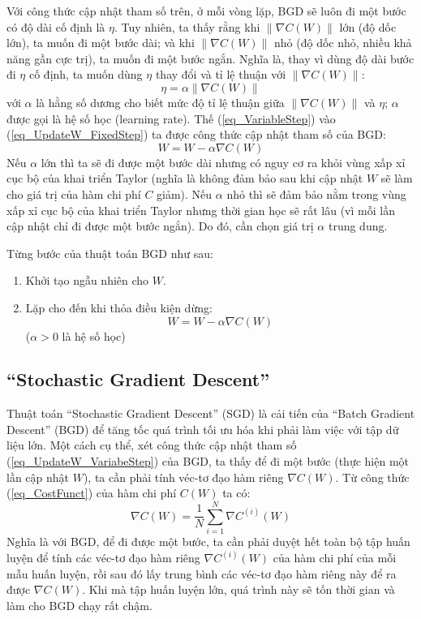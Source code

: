 Với công thức cập nhật tham số trên, ở mỗi vòng lặp, BGD sẽ luôn đi một bước có độ dài cố định là $\eta$. Tuy nhiên, ta thấy rằng khi $\|\nabla C(W)\|$ lớn (độ dốc lớn), ta muốn đi một bước dài; và khi $\|\nabla C(W)\|$ nhỏ (độ dốc nhỏ, nhiều khả năng gần cực trị), ta muốn đi một bước ngắn. Nghĩa là, thay vì dùng độ dài bước đi $\eta$ cố định, ta muốn dùng $\eta$ thay đổi và tỉ lệ thuận với $\|\nabla C(W)\|$:
\begin{equation}
	\eta = \alpha \|\nabla C(W)\|
	\label{eq_VariableStep}
\end{equation}
với $\alpha$ là hằng số dương cho biết mức độ tỉ lệ thuận giữa $\|\nabla C(W)\|$ và $\eta$; $\alpha$ được gọi là hệ số học (learning rate). Thế (\ref{eq_VariableStep}) vào (\ref{eq_UpdateW_FixedStep}) ta được công thức cập nhật tham số của BGD:
\begin{equation}
	W = W - \alpha \nabla C(W)
	\label{eq_UpdateW_VariabeStep}
\end{equation}
Nếu $\alpha$ lớn thì ta sẽ đi được một bước dài nhưng có nguy cơ ra khỏi vùng xấp xỉ cục bộ của khai triển Taylor (nghĩa là không đảm bảo sau khi cập nhật $W$ sẽ làm cho giá trị của hàm chi phí $C$ giảm). Nếu $\alpha$ nhỏ thì sẽ đảm bảo nằm trong vùng xấp xỉ cục bộ của khai triển Taylor nhưng thời gian học sẽ rất lâu (vì mỗi lần cập nhật chỉ đi được một bước ngắn). Do đó, cần chọn giá trị $\alpha$ trung dung.

\begin{leftbar}
Từng bước của thuật toán BGD như sau:
	\begin{enumerate}
		\item Khởi tạo ngẫu nhiên cho $W$.
		\item Lặp cho đến khi thỏa điều kiện dừng:
		\[
			W = W - \alpha \nabla C(W)
		\]
		($\alpha>0$ là hệ số học)
	\end{enumerate}
\end{leftbar}

\subsection{``Stochastic Gradient Descent''}
Thuật toán ``Stochastic Gradient Descent'' (SGD) là cải tiến của ``Batch Gradient Descent'' (BGD) để tăng tốc quá trình tối ưu hóa khi phải làm việc với tập dữ liệu lớn. Một cách cụ thể, xét công thức cập nhật tham số (\ref{eq_UpdateW_VariabeStep}) của BGD, ta thấy để đi một bước (thực hiện một lần cập nhật $W$), ta cần phải tính véc-tơ đạo hàm riêng $\nabla C(W)$. Từ công thức (\ref{eq_CostFunct}) của hàm chi phí $C(W)$ ta có:
\begin{equation}
	\nabla C(W) = \frac{1}{N} \sum_{i=1}^N \nabla C^{(i)}(W)
\end{equation}
Nghĩa là với BGD, để đi được một bước, ta cần phải duyệt hết toàn bộ tập huấn luyện để tính các véc-tơ đạo hàm riêng $\nabla C^{(i)}(W)$ của hàm chi phí của mỗi mẫu huấn luyện, rồi sau đó lấy trung bình các véc-tơ đạo hàm riêng này để ra được $\nabla C(W)$. Khi mà tập huấn luyện lớn, quá trình này sẽ tốn thời gian và làm cho BGD chạy rất chậm.

